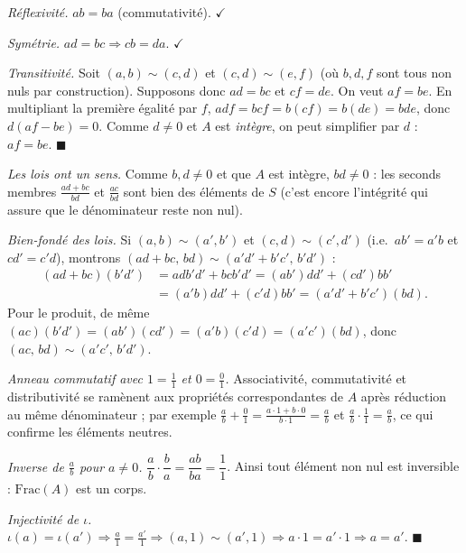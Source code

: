 
\begin{mdframed}[style=proofbar]
  \textit{Réflexivité.} $ab = ba$ (commutativité). $\checkmark$

  \textit{Symétrie.} $ad=bc \Rightarrow cb=da$. $\checkmark$

  \textit{Transitivité.} Soit $(a,b)\sim(c,d)$ et $(c,d)\sim(e,f)$
  (où $b,d,f$ sont tous non nuls par construction).
  Supposons donc $ad=bc$ et $cf=de$.
  On veut $af=be$. En multipliant la première égalité par $f$,
  $adf = bcf = b(cf) = b(de) = bde$,
  donc $d(af-be)=0$. Comme $d\neq 0$ et $A$ est \emph{intègre}, on peut
  simplifier par $d$ : $af=be$. $\blacksquare$
\end{mdframed}


\begin{mdframed}[style=proofbar]
  \textit{Les lois ont un sens.} Comme $b,d\neq 0$ et que $A$ est intègre,
  $bd\neq 0$ : les seconds membres $\tfrac{ad+bc}{bd}$ et $\tfrac{ac}{bd}$ sont
  bien des éléments de $S$ (c'est encore l'intégrité qui assure que le
  dénominateur reste non nul).

  \smallskip
  \textit{Bien-fondé des lois.} Si $(a,b)\sim(a',b')$ et $(c,d)\sim(c',d')$
  (i.e.\ $ab'=a'b$ et $cd'=c'd$), montrons $(ad+bc,\,bd)\sim(a'd'+b'c',\,b'd')$ :
  \begin{align*}
    (ad+bc)(b'd') &= adb'd' + bcb'd' = (ab')dd' + (cd')bb' \\
                  &= (a'b)dd'+(c'd)bb' = (a'd'+b'c')(bd).
  \end{align*}
  Pour le produit, de même
  $(ac)(b'd') = (ab')(cd') = (a'b)(c'd) = (a'c')(bd)$, donc
  $(ac,\,bd)\sim(a'c',\,b'd')$.

  \textit{Anneau commutatif avec $1=\tfrac{1}{1}$ et $0=\tfrac{0}{1}$.}
  Associativité, commutativité et distributivité se ramènent aux propriétés
  correspondantes de $A$ après réduction au même dénominateur ; par exemple
  $\tfrac{a}{b}+\tfrac{0}{1}=\tfrac{a\cdot 1+b\cdot 0}{b\cdot 1}=\tfrac{a}{b}$ et
  $\tfrac{a}{b}\cdot\tfrac{1}{1}=\tfrac{a}{b}$, ce qui confirme les éléments neutres.

  \textit{Inverse de $\tfrac{a}{b}$ pour $a\neq 0$.}
  $\dfrac{a}{b}\cdot\dfrac{b}{a} = \dfrac{ab}{ba} = \dfrac{1}{1}$.
  Ainsi tout élément non nul est inversible : $\mathrm{Frac}(A)$ est un corps.

  \textit{Injectivité de $\iota$.}
  $\iota(a)=\iota(a') \Rightarrow \tfrac{a}{1}=\tfrac{a'}{1}
  \Rightarrow (a,1)\sim(a',1) \Rightarrow a\cdot 1 = a'\cdot 1 \Rightarrow a=a'$. $\blacksquare$
\end{mdframed}

